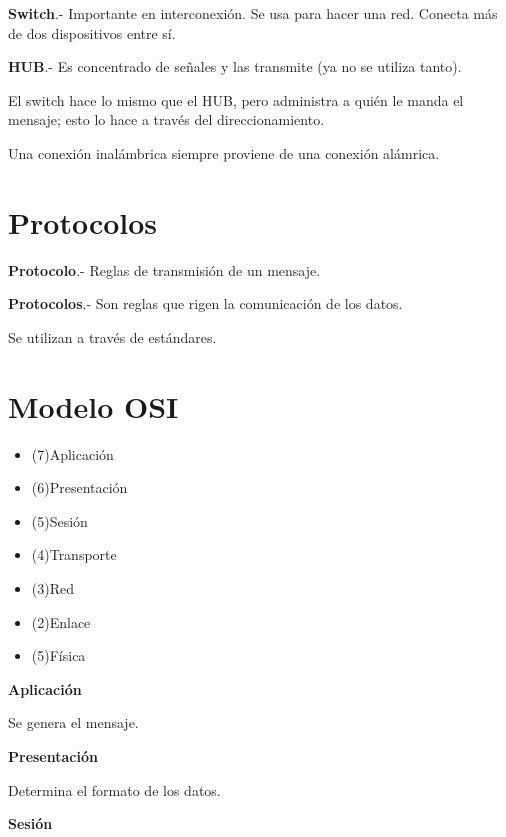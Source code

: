 \documentclass{article}
\begin{document}
\textbf{Switch}.- Importante en interconexión. Se usa para hacer una red. Conecta
más de dos dispositivos entre sí.
\vspace{1em}

\textbf{HUB}.- Es concentrado de señales y las transmite (ya no se utiliza tanto).
\vspace{1em}

El switch hace lo mismo que el HUB, pero administra a quién le manda el mensaje;
esto lo hace a través del direccionamiento.
\vspace{1em}

Una conexión inalámbrica siempre proviene de una conexión alámrica.

\section{Protocolos}

\textbf{Protocolo}.- Reglas de transmisión de un mensaje.
\vspace{1em}

\textbf{Protocolos}.- Son reglas que rigen la comunicación de los datos.
\vspace{1em}

Se utilizan a través de estándares.

\section{Modelo OSI}

\begin{itemize}
	\item
	(7)Aplicación
	\item
	(6)Presentación
	\item
	(5)Sesión
	\item
	(4)Transporte
	\item
	(3)Red
	\item
	(2)Enlace
	\item
	(5)Física
\end{itemize}
\vspace{1em}

\textbf{Aplicación}

Se genera el mensaje.
\vspace{1em}

\textbf{Presentación}

Determina el formato de los datos.
\vspace{1em}

\textbf{Sesión}
\end{document}
